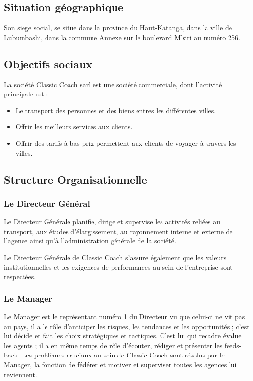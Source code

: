         \subsection[Situation géographique]{Situation géographique}
        Son siege social, se situe dans la province du Haut-Katanga, dans la ville de Lubumbashi,
        dans la commune Annexe sur le boulevard M’siri au numéro 256.        

        \subsection[Objectifs sociaux]{Objectifs sociaux}
        La société Classic Coach \acrshort{sarl} est une société commerciale,
        dont l’activité principale est :
        \par
        \begin{itemize}
            \setlength{\itemsep}{0pt}
            \item [\ding{226}] Le transport des personnes et des biens entres les différentes villes.
            \item [\ding{226}] Offrir les meilleurs services aux clients.
            \item [\ding{226}] Offrir des tarifs à bas prix permettent aux clients de voyager à travers les villes.
        \end{itemize}
        \subsection[Structure Organisationnelle]{Structure Organisationnelle}
            \subsubsection[Le Directeur Général]{Le Directeur Général}
            Le Directeur Générale planifie, dirige et supervise les activités reliées
            au transport, aux études d’élargissement, au rayonnement interne et externe
            de l’agence ainsi qu’à l’administration générale de la société.
            \par\noindent
            Le Directeur Générale de Classic Coach s’assure également que les valeurs
            institutionnelles et les exigences de performances au sein de l’entreprise sont respectées.

            \subsubsection[Le Manager]{Le Manager}
            Le Manager est le représentant numéro 1 du Directeur vu que celui-ci ne vit pas au pays,
            il a le rôle d’anticiper les risques, les tendances et les opportunités ; c’est lui décide
            et fait les choix stratégiques et tactiques. C’est lui qui recadre évalue les agents ;
            il a en même temps de rôle d’écouter, rédiger et présenter les feeds-back.
            Les problèmes cruciaux au sein de Classic Coach sont résolus par le Manager,
            la fonction de fédérer et motiver et superviser toutes les agences lui reviennent.

